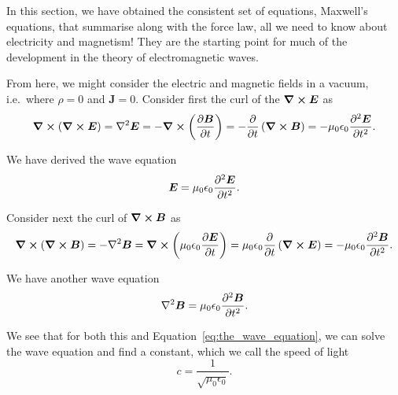 \documentclass[12pt,chapterprefix=false,dvipsnames]{scrbook}
\theoremstyle{dotless}
\theoremstyle{definition}
\begin{document}
In this section, we have obtained the consistent set of
equations, Maxwell's equations, that summarise along with the
force law, all we need to know about electricity and magnetism!
They are the starting point for much of the development in the
theory of electromagnetic waves.

From here, we might consider the electric and magnetic fields in
a vacuum, i.e.\ where $\rho = 0$ and
$\bm{J} = 0$. Consider first the curl of the
$\curl{\bm{E}}$ as
\begin{equation}
	\curl{\left(\curl{\bm{E}}\right)} = \laplacian{\bm{E}}
	=
	-\curl{\left(\pdv{\bm{B}}{t}\right)}
	=
	-\pdv{}{t}\left(\curl{\bm{B}}\right)
	=
	-\mu_{0}\epsilon_{0}\pdv[2]{\bm{E}}{t}.
\end{equation}

We have derived the wave equation
\begin{equation}
	\label{eq:the_wave_equation}%
	\bm{E} =
	\mu_{0}\epsilon_{0}\pdv[2]{\bm{E}}{t}.
\end{equation}

Consider next the curl of $\curl{\bm{B}}$ as
\begin{equation}
	\curl{\left(\curl{\bm{B}}\right)} = -\laplacian{\bm{B}}
	= \curl{\left(\mu_{0}\epsilon_{0}\pdv{\bm{E}}{t}\right)}
	=
	\mu_{0}\epsilon_{0}\pdv{}{t}\left(\curl{\bm{E}}\right)
	=
	-\mu_{0}\epsilon_{0}\pdv[2]{\bm{B}}{t}.
\end{equation}

We have another wave equation
\begin{equation}
	\laplacian{\bm{B}} =
	\mu_{0}\epsilon_{0}\pdv[2]{\bm{B}}{t}.
\end{equation}

We see that for both this and Equation~\ref{eq:the_wave_equation},
we can solve the wave equation and find a constant, which we
call the speed of light
\begin{equation}
	\label{eq:speed_of_light_constant}%
	c = \frac{1}{\sqrt{\mu_{0}\epsilon_{0}}}.
\end{equation}
\end{document}
